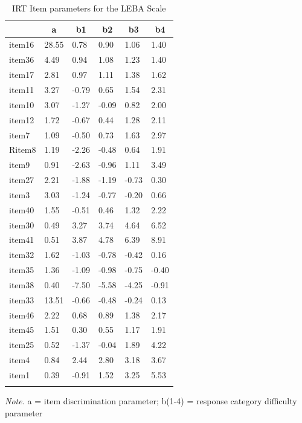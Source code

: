\documentclass[
  english,
  man]{apa6}
\begin{document}
\begin{table}[tbp]

\begin{center}
\begin{threeparttable}

\caption{\label{tab:IRTparameters}IRT Item parameters for the LEBA Scale}

\begin{tabular}{llllll}
\toprule
 & \multicolumn{1}{c}{a} & \multicolumn{1}{c}{b1} & \multicolumn{1}{c}{b2} & \multicolumn{1}{c}{b3} & \multicolumn{1}{c}{b4}\\
\midrule
item16 & 28.55 & 0.78 & 0.90 & 1.06 & 1.40\\
item36 & 4.49 & 0.94 & 1.08 & 1.23 & 1.40\\
item17 & 2.81 & 0.97 & 1.11 & 1.38 & 1.62\\
item11 & 3.27 & -0.79 & 0.65 & 1.54 & 2.31\\
item10 & 3.07 & -1.27 & -0.09 & 0.82 & 2.00\\
item12 & 1.72 & -0.67 & 0.44 & 1.28 & 2.11\\
item7 & 1.09 & -0.50 & 0.73 & 1.63 & 2.97\\
Ritem8 & 1.19 & -2.26 & -0.48 & 0.64 & 1.91\\
item9 & 0.91 & -2.63 & -0.96 & 1.11 & 3.49\\
item27 & 2.21 & -1.88 & -1.19 & -0.73 & 0.30\\
item3 & 3.03 & -1.24 & -0.77 & -0.20 & 0.66\\
item40 & 1.55 & -0.51 & 0.46 & 1.32 & 2.22\\
item30 & 0.49 & 3.27 & 3.74 & 4.64 & 6.52\\
item41 & 0.51 & 3.87 & 4.78 & 6.39 & 8.91\\
item32 & 1.62 & -1.03 & -0.78 & -0.42 & 0.16\\
item35 & 1.36 & -1.09 & -0.98 & -0.75 & -0.40\\
item38 & 0.40 & -7.50 & -5.58 & -4.25 & -0.91\\
item33 & 13.51 & -0.66 & -0.48 & -0.24 & 0.13\\
item46 & 2.22 & 0.68 & 0.89 & 1.38 & 2.17\\
item45 & 1.51 & 0.30 & 0.55 & 1.17 & 1.91\\
item25 & 0.52 & -1.37 & -0.04 & 1.89 & 4.22\\
item4 & 0.84 & 2.44 & 2.80 & 3.18 & 3.67\\
item1 & 0.39 & -0.91 & 1.52 & 3.25 & 5.53\\
\bottomrule
\addlinespace
\end{tabular}

\begin{tablenotes}[para]
\normalsize{\textit{Note.} a = item discrimination parameter; b(1-4) = response category difficulty parameter}
\end{tablenotes}

\end{threeparttable}
\end{center}

\end{table}
\end{document}

